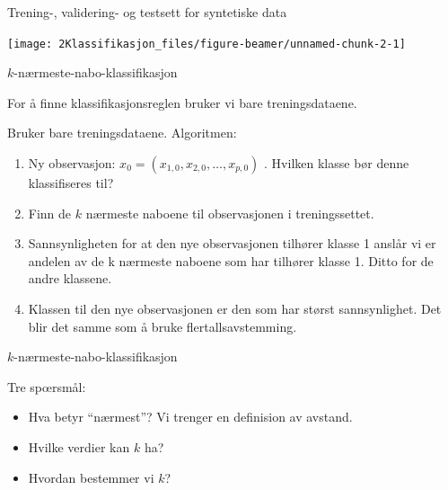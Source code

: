 \documentclass[10pt,ignorenonframetext,]{beamer}
\providecommand{\tightlist}{%
  \setlength{\itemsep}{0pt}\setlength{\parskip}{0pt}}
\begin{document}
\begin{frame}{Trening-, validering- og testsett for syntetiske data}
\protect\hypertarget{trening--validering--og-testsett-for-syntetiske-data}{}

\begin{center}\texttt{[image: 2Klassifikasjon\_files/figure-beamer/unnamed-chunk-2-1]} \end{center}

\end{frame}

\begin{frame}{\(k\)-nærmeste-nabo-klassifikasjon}
\protect\hypertarget{k-nuxe6rmeste-nabo-klassifikasjon}{}

For å finne klassifikasjonsreglen bruker vi bare treningsdataene.

Bruker bare treningsdataene. Algoritmen:

\begin{enumerate}
[1)]
\item
  Ny observasjon: \(x_0=(x_{1,0}, x_{2,0} , \ldots , x_{p,0})\) .
  Hvilken klasse bør denne klassifiseres til?
\item
  Finn de \(k\) nærmeste naboene til observasjonen i treningssettet.
\item
  Sannsynligheten for at den nye observasjonen tilhører klasse 1 anslår
  vi er andelen av de k nærmeste naboene som har tilhører klasse 1.
  Ditto for de andre klassene.
\item
  Klassen til den nye observasjonen er den som har størst sannsynlighet.
  Det blir det samme som å bruke flertallsavstemming.
\end{enumerate}

\end{frame}

\begin{frame}{\(k\)-nærmeste-nabo-klassifikasjon}
\protect\hypertarget{k-nuxe6rmeste-nabo-klassifikasjon-1}{}

\vspace{5mm}

Tre sp\oe rsm\aa l: \vspace{5mm}

\begin{itemize}
\tightlist
\item
  Hva betyr ``n\ae rmest''? Vi trenger en definision av avstand.
\end{itemize}

\vspace{1.5cm}

\begin{itemize}
\tightlist
\item
  Hvilke verdier kan \(k\) ha?
\end{itemize}

\vspace{1.5cm}

\begin{itemize}
\tightlist
\item
  Hvordan bestemmer vi \(k\)?
\end{itemize}

\end{frame}
\end{document}
